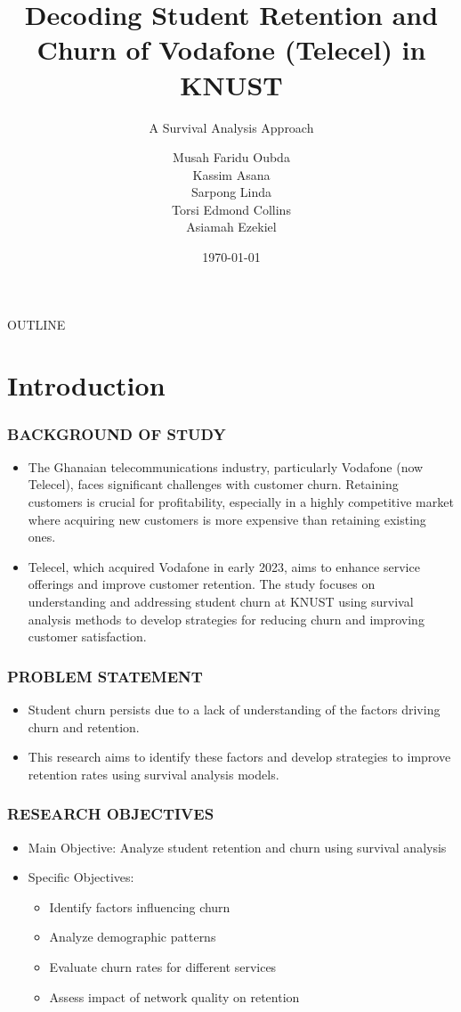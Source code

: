 \documentclass{beamer}
\title{Decoding Student Retention and Churn of Vodafone (Telecel) in KNUST}
\subtitle{A Survival Analysis Approach}
\author{Musah Faridu Oubda
	\\ Kassim Asana
	\\ Sarpong Linda
	\\ Torsi Edmond Collins
	\\ Asiamah Ezekiel}
\institute{Kwame Nkrumah University of Science and Technology}
\date{\today}
\begin{document}
	\begin{frame}
		\titlepage
	\end{frame}
	
	\begin{frame}{OUTLINE}
		\tableofcontents
	\end{frame}
	
	
	\section{Introduction}
	
	\begin{frame}
		\frametitle{BACKGROUND OF STUDY}
		\begin{itemize}
			
			
			\item 	The Ghanaian telecommunications industry, particularly Vodafone (now Telecel), faces significant challenges with customer churn. Retaining customers is crucial for profitability, especially in a highly competitive market where acquiring new customers is more expensive than retaining existing ones.
			\item 	
			Telecel, which acquired Vodafone in early 2023, aims to enhance service offerings and improve customer retention. The study focuses on understanding and addressing student churn at KNUST using survival analysis methods to develop strategies for reducing churn and improving customer satisfaction.
			
		\end{itemize}
	\end{frame}
	
	\begin{frame}
		\frametitle{PROBLEM STATEMENT}
		\begin{itemize}
			\item Student churn persists due to a lack of understanding of the factors driving churn and retention. 
			\item This research aims to identify these factors and develop strategies to improve retention rates using survival analysis models.
			
			
		\end{itemize}
	\end{frame}
	
	\begin{frame}
		\frametitle{RESEARCH OBJECTIVES}
		\begin{itemize}
			\item Main Objective: Analyze student retention and churn using survival analysis
			\item Specific Objectives:
			\begin{itemize}
				\item Identify factors influencing churn
				\item Analyze demographic patterns
				\item Evaluate churn rates for different services
				\item Assess impact of network quality on retention
			\end{itemize}
		\end{itemize}
	\end{frame}
	
\end{document}

